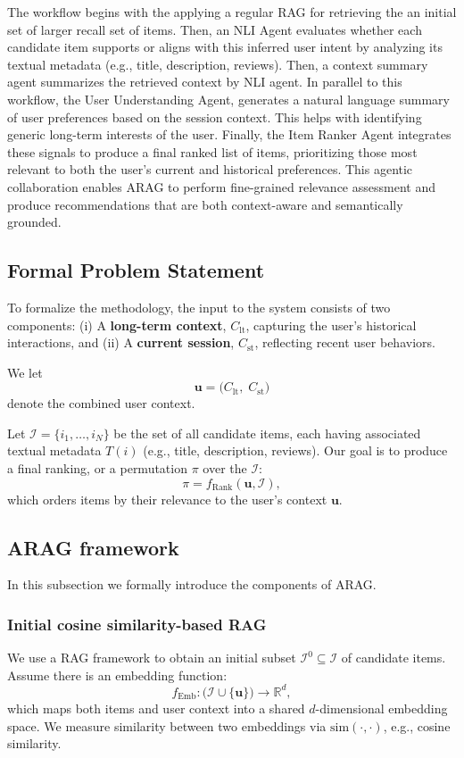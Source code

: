 \documentclass[sigconf]{acmart}
\begin{document}
The workflow begins with the applying a regular RAG for retrieving the an initial set of larger recall set of items. Then, an NLI Agent evaluates whether each candidate item supports or aligns with this inferred user intent by analyzing its textual metadata (e.g., title, description, reviews). Then, a context summary agent summarizes the retrieved context by NLI agent. In parallel to this workflow, the User Understanding Agent, generates a natural language summary of user preferences based on the session context. This helps with identifying generic long-term interests of the user. Finally, the Item Ranker Agent integrates these signals to produce a final ranked list of items, prioritizing those most relevant to both the user’s current and historical preferences. This agentic collaboration enables ARAG to perform fine-grained relevance assessment and produce recommendations that are both context-aware and semantically grounded.

\subsection{Formal Problem Statement}
To formalize the methodology, the input to the system consists of two components: (i) A \textbf{long-term context}, $C_{\mathrm{lt}}$, capturing the user's historical interactions, and (ii) A \textbf{current session}, $C_{\mathrm{st}}$, reflecting recent user behaviors.

We let
\[
    \mathbf{u} = \bigl(C_{\mathrm{lt}}, \; C_{\mathrm{st}}\bigr)
\]
denote the combined user context. 

Let $\mathcal{I} = \{ i_1, \ldots, i_N\}$ be the set of all candidate items, each having associated textual metadata $T(i)$ (e.g., title, description, reviews). Our goal is to produce a final ranking, or a permutation $\pi$ over the $\mathcal{I}$:
\[
    \pi = f_{\mathrm{Rank}}(\mathbf{u}, \mathcal{I}),
\]
which orders items by their relevance to the user's context $\mathbf{u}$.
\subsection{ARAG framework}
In this subsection we formally introduce the components of ARAG. 

\subsubsection{Initial cosine similarity-based RAG} We use a RAG framework to obtain an initial subset $\mathcal{I}^0 \subseteq \mathcal{I}$ of candidate items. Assume there is an embedding function:
\[
    f_{\mathrm{Emb}}: \bigl(\mathcal{I} \cup \{\mathbf{u}\}\bigr) \rightarrow \mathbb{R}^d,
\]
which maps both items and user context into a shared $d$-dimensional embedding space. We measure similarity between two embeddings via $\mathrm{sim}(\cdot,\cdot)$, e.g., cosine similarity. 
\end{document}
